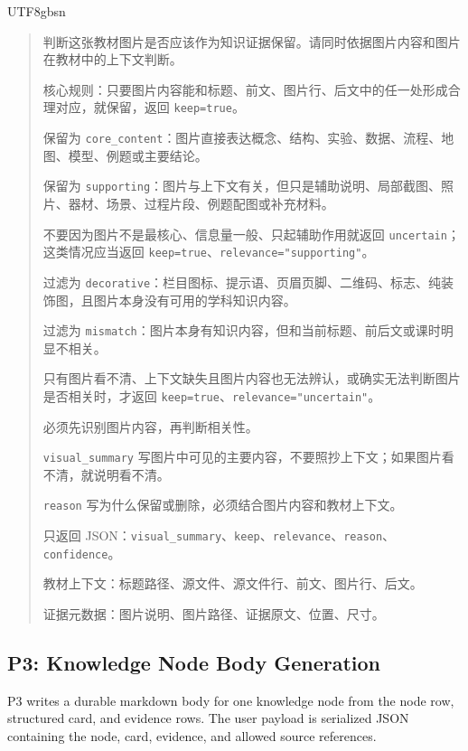 \documentclass[11pt,letterpaper]{article}
\newcommand{\code}[1]{\nolinkurl{#1}}
\newenvironment{prompttranscript}{%
\begin{CJK}{UTF8}{gbsn}%
\begin{quote}%
\small%
\sloppy%
\setlength{\parskip}{0.35em}%
\setlength{\parindent}{0pt}%
}{%
\end{quote}%
\end{CJK}%
}
\newenvironment{prompttranscript}{%
\begin{quote}%
\small%
\sloppy%
\setlength{\parskip}{0.35em}%
\setlength{\parindent}{0pt}%
}{%
\end{quote}%
}
\begin{document}
\begin{prompttranscript}
判断这张教材图片是否应该作为知识证据保留。请同时依据图片内容和图片在教材中的上下文判断。\par
核心规则：只要图片内容能和标题、前文、图片行、后文中的任一处形成合理对应，就保留，返回 \code{keep=true}。\par
保留为 \code{core\_content}：图片直接表达概念、结构、实验、数据、流程、地图、模型、例题或主要结论。\par
保留为 \code{supporting}：图片与上下文有关，但只是辅助说明、局部截图、照片、器材、场景、过程片段、例题配图或补充材料。\par
不要因为图片不是最核心、信息量一般、只起辅助作用就返回 \code{uncertain}；这类情况应当返回 \code{keep=true}、\code{relevance="supporting"}。\par
过滤为 \code{decorative}：栏目图标、提示语、页眉页脚、二维码、标志、纯装饰图，且图片本身没有可用的学科知识内容。\par
过滤为 \code{mismatch}：图片本身有知识内容，但和当前标题、前后文或课时明显不相关。\par
只有图片看不清、上下文缺失且图片内容也无法辨认，或确实无法判断图片是否相关时，才返回 \code{keep=true}、\code{relevance="uncertain"}。\par
必须先识别图片内容，再判断相关性。\par
\code{visual\_summary} 写图片中可见的主要内容，不要照抄上下文；如果图片看不清，就说明看不清。\par
\code{reason} 写为什么保留或删除，必须结合图片内容和教材上下文。\par
只返回 JSON：\code{visual\_summary}、\code{keep}、\code{relevance}、\code{reason}、\code{confidence}。\par

教材上下文：标题路径、源文件、源文件行、前文、图片行、后文。\par
证据元数据：图片说明、图片路径、证据原文、位置、尺寸。
\end{prompttranscript}

\subsection{P3: Knowledge Node Body Generation}

P3 writes a durable markdown body for one knowledge node from the node row, structured card, and evidence rows. The user payload is serialized JSON containing the node, card, evidence, and allowed source references.
\end{document}
